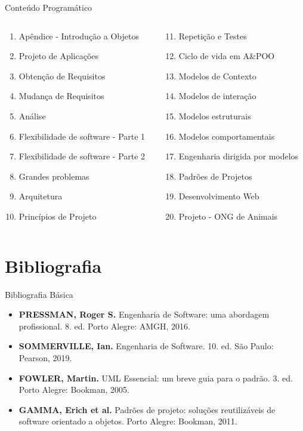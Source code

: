 \documentclass[aspectratio=169]{beamer}
\begin{document}
\begin{frame}{Conteúdo Programático}
\begin{columns}
\begin{column}{0.5\textwidth}
\begin{enumerate}
    \item Apêndice - Introdução a Objetos
    \item Projeto de Aplicações
    \item Obtenção de Requisitos
    \item Mudança de Requisitos
    \item Análise
    \item Flexibilidade de software - Parte 1
    \item Flexibilidade de software - Parte 2
    \item Grandes problemas
    \item Arquitetura
    \item Princípios de Projeto
\end{enumerate}
\end{column}
\begin{column}{0.5\textwidth}
\begin{enumerate}
    \setcounter{enumi}{10}
    \item Repetição e Testes
    \item Ciclo de vida em A\&POO
    \item Modelos de Contexto
    \item Modelos de interação
    \item Modelos estruturais
    \item Modelos comportamentais
    \item Engenharia dirigida por modelos
    \item Padrões de Projetos
    \item Desenvolvimento Web
    \item Projeto - ONG de Animais
\end{enumerate}
\end{column}
\end{columns}
\end{frame}

\section{Bibliografia}

\begin{frame}{Bibliografia Básica}
\begin{itemize}
    \item \textbf{PRESSMAN, Roger S.} Engenharia de Software: uma abordagem profissional. 8. ed. Porto Alegre: AMGH, 2016.
    \item \textbf{SOMMERVILLE, Ian.} Engenharia de Software. 10. ed. São Paulo: Pearson, 2019.
    \item \textbf{FOWLER, Martin.} UML Essencial: um breve guia para o padrão. 3. ed. Porto Alegre: Bookman, 2005.
    \item \textbf{GAMMA, Erich et al.} Padrões de projeto: soluções reutilizáveis de software orientado a objetos. Porto Alegre: Bookman, 2011.
\end{itemize}
\end{frame}
\end{document}
